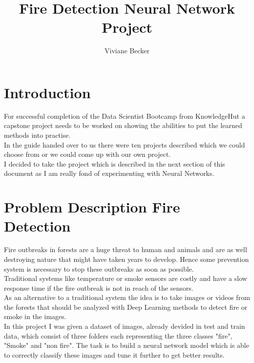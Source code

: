\documentclass[]{article}
\title{Fire Detection Neural Network Project}
\author{Viviane Becker}
\begin{document}
\maketitle
\newpage
\tableofcontents
\newpage

\section{Introduction}
For successful completion of the Data Scientist Bootcamp from KnowledgeHut a capstone project needs to be worked on showing the abilities to put the learned methods into practise.\\
In the guide handed over to us there were ten projects described which we could choose from or we could come up with our own project.\\
I decided to take the project which is described in the next section of this document as I am really fond of experimenting with Neural Networks.
	
\section{Problem Description Fire Detection}
Fire outbreaks in forests are a huge threat to human and animals and are as well destroying nature that might have taken years to develop. Hence some prevention system is necessary to stop these outbreaks as soon as possible.\\
Traditional systems like temperature or smoke sensors are costly and have a slow response time if the fire outbreak is not in reach of the sensors.\\
As an alternative to a traditional system the idea is to take images or videos from the forests that should be analyzed with Deep Learning methods to detect fire or smoke in the images.\\
In this project I was given a dataset of images, already devided in test and train data, which consist of three folders each representing the three classes "fire", "Smoke" and "non fire". The task is to build a neural network model which is able to correctly classify these images and tune it further to get better results.\\
\end{document}
